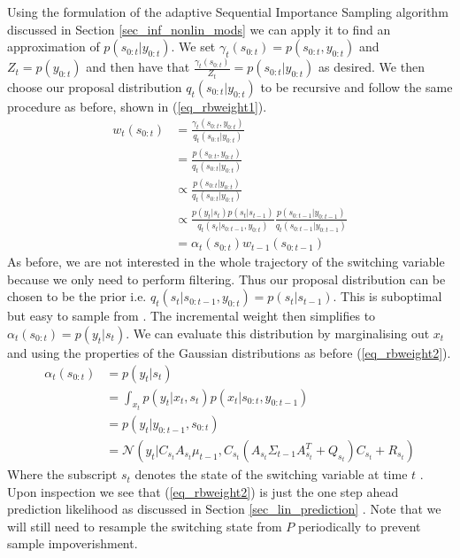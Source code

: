 Using the formulation of the adaptive Sequential Importance Sampling algorithm discussed in Section \ref{sec_inf_nonlin_mods} we can apply it to find an approximation of $p(s_{0:t}|y_{0:t})$. We set $\gamma_t(s_{0:t})=p(s_{0:t},y_{0:t})$ and $Z_t=p(y_{0:t})$ and then have that $\frac{\gamma_t(s_{0:t})}{Z_t} = p(s_{0:t}|y_{0:t})$ as desired. We then choose our proposal distribution $q_t(s_{0:t}|y_{0:t})$ to be recursive and follow the same procedure as before, shown in (\ref{eq_rbweight1}).
\begin{equation}
\begin{aligned}
w_t(s_{0:t}) &= \frac{\gamma_t(s_{0:t},y_{0:t})}{q_t(s_{0:t}|y_{0:t})} \\
&= \frac{p(s_{0:t},y_{0:t})}{q_t(s_{0:t}|y_{0:t})} \\
&\propto \frac{p(s_{0:t}|y_{0:t})}{q_t(s_{0:t}|y_{0:t})} \\
&\propto \frac{p(y_t|s_t)p(s_t|s_{t-1})}{q_t(s_t|s_{0:t-1},y_{0:t})}\frac{p(s_{0:t-1}|y_{0:t-1})}{q_t(s_{0:t-1}|y_{0:t-1})} \\
&= \alpha_t(s_{0:t})w_{t-1}(s_{0:t-1})
\end{aligned}
\label{eq_rbweight1}
\end{equation}
As before, we are not interested in the whole trajectory of the switching variable because we only need to perform filtering. Thus our proposal distribution can be chosen to be the prior i.e. $q_t(s_t|s_{0:t-1},y_{0:t}) = p(s_t|s_{t-1})$. This is suboptimal but easy to sample from \cite{doucet}. The incremental weight then simplifies to $\alpha_t(s_{0:t}) = p(y_t|s_t)$. We can evaluate this distribution by marginalising out $x_t$ and using the properties of the Gaussian distributions as before (\ref{eq_rbweight2}).
\begin{equation}
\begin{aligned}
\alpha_t(s_{0:t}) &= p(y_t|s_t) \\
&= \int_{x_t} p(y_t|x_t,s_t)p(x_t|s_{0:t},y_{0:t-1}) \\
&= p(y_t|y_{0:t-1}, s_{0:t}) \\
&= \mathcal{N}\left(y_t | C_{s_t}A_{s_t}\mu_{t-1}, C_{s_t}\left(A_{s_t}\Sigma_{t-1}A_{s_t}^T+Q_{s_t} \right)C_{s_t} + R_{s_t} \right)
\end{aligned}
\label{eq_rbweight2}
\end{equation} 
Where the subscript $s_t$ denotes the state of the switching variable at time $t$ \cite{murphy1}. Upon inspection we see that (\ref{eq_rbweight2}) is just the one step ahead prediction likelihood as discussed in Section \ref{sec_lin_prediction} \cite{murphy1}. Note that we will still need to resample the switching state from $P$ periodically to prevent sample impoverishment. 

